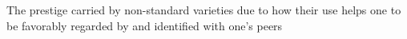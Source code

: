 The prestige carried by non-standard varieties due to how their use helps one to be favorably regarded by and identified with one's peers
